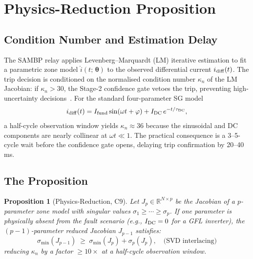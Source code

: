 \documentclass[journal,twoside]{IEEEtran}
\newtheorem{proposition}{Proposition}
\begin{document}
\section{Physics-Reduction Proposition}
\label{sec:prop_c9}

\subsection{Condition Number and Estimation Delay}
\label{sec:kappa}

The SAMBP relay applies Levenberg--Marquardt (LM) iterative estimation to fit a
parametric zone model $\hat{i}(t;\,\bm{\theta})$ to the observed differential
current $i_{\rm diff}(t)$.
The trip decision is conditioned on the normalised condition number $\kappa_n$
of the LM Jacobian: if $\kappa_n > 30$, the Stage-2 confidence gate vetoes the
trip, preventing high-uncertainty decisions~\cite{SAMBP_TR56}.
For the standard four-parameter SG model
\begin{equation}
  i_{\rm diff}(t) = I_{\rm fund}\sin(\omega t + \varphi)
                    + I_{\rm DC}\,e^{-t/\tau_{\rm DC}},
  \label{eq:sg_model}
\end{equation}
a half-cycle observation window yields $\kappa_n \approx 36$ because the
sinusoidal and DC components are nearly collinear at $\omega t \ll 1$.
The practical consequence is a 3--5-cycle wait before the confidence gate opens,
delaying trip confirmation by 20--40\,ms.

\subsection{The Proposition}
\label{sec:prop_statement}

\begin{proposition}[Physics-Reduction, C9]
\label{prop:phys_reduction}
Let $J_p \in \mathbb{R}^{N \times p}$ be the Jacobian of a $p$-parameter zone
model with singular values $\sigma_1 \geq \cdots \geq \sigma_p$.
If one parameter is physically absent from the fault scenario (e.g., $I_{\rm DC}
= 0$ for a GFL inverter), the $(p-1)$-parameter reduced Jacobian $J_{p-1}$
satisfies:
\begin{equation}
  \sigma_{\min}(J_{p-1}) \;\geq\; \sigma_{\min}(J_p) + \sigma_p(J_p),
  \quad\text{(SVD interlacing)}
  \label{eq:svd_interlacing}
\end{equation}
reducing $\kappa_n$ by a factor $\geq\!10\times$ at a half-cycle observation
window.
\end{proposition}
\end{document}
